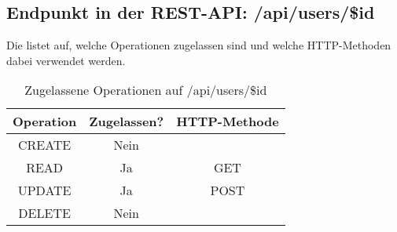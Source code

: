 \subsection{Endpunkt in der REST-API: /api/users/\$id}
Die  listet auf, welche Operationen zugelassen sind und welche HTTP-Methoden dabei verwendet werden. 

\begin{table}[!htbp]
	\begin{tabular}{|c|c|c|}
		\hline
			\textbf{Operation} & \textbf{Zugelassen?} & \textbf{HTTP-Methode} \\ \hline
			CREATE & Nein & \\ \hline  
			READ & Ja & GET \\ \hline
			UPDATE & Ja & POST \\ \hline 
			DELETE & Nein & \\ \hline
	\end{tabular}

		\caption{Zugelassene Operationen auf /api/users/\$id}
		\label{tab:rest:api:users:id:meth}
\end{table}

